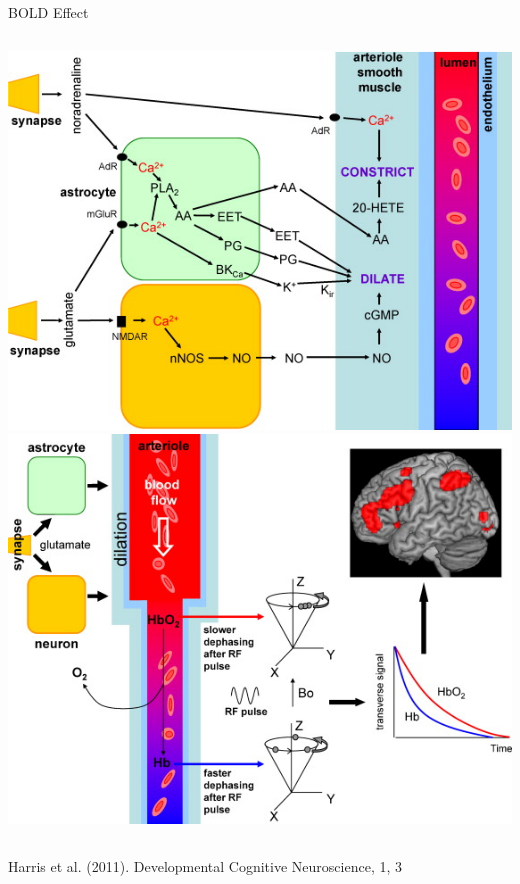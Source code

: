 \documentclass[aspectratio=169,xcolor=dvipsnames]{beamer}
\begin{document}
\begin{frame}{BOLD Effect}
\begin{columns}[c]
\includegraphics[width=1\textwidth]{imgs/neurovasccoupling2}
\includegraphics[width=1\textwidth]{imgs/bold}
\end{columns}

\tiny{Harris et al.  (2011). Developmental Cognitive Neuroscience, 1, 3}
\end{frame}

\end{document}
